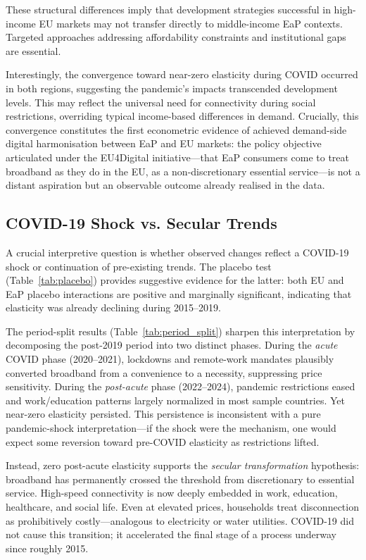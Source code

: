 These structural differences imply that development strategies successful in high-income EU markets may not transfer directly to middle-income EaP contexts. Targeted approaches addressing affordability constraints and institutional gaps are essential.

Interestingly, the convergence toward near-zero elasticity during COVID occurred in both regions, suggesting the pandemic's impacts transcended development levels. This may reflect the universal need for connectivity during social restrictions, overriding typical income-based differences in demand. Crucially, this convergence constitutes the first econometric evidence of achieved demand-side digital harmonisation between EaP and EU markets: the policy objective articulated under the EU4Digital initiative---that EaP consumers come to treat broadband as they do in the EU, as a non-discretionary essential service---is not a distant aspiration but an observable outcome already realised in the data.

\subsection{COVID-19 Shock vs. Secular Trends}

A crucial interpretive question is whether observed changes reflect a COVID-19 shock or
continuation of pre-existing trends. The placebo test (Table~\ref{tab:placebo}) provides
suggestive evidence for the latter: both EU and EaP
placebo interactions are positive and marginally significant, indicating that elasticity
was already declining during 2015--2019.

The period-split results (Table~\ref{tab:period_split}) sharpen this interpretation by
decomposing the post-2019 period into two distinct phases. During the \emph{acute} COVID
phase (2020--2021), lockdowns and remote-work mandates plausibly converted broadband from
a convenience to a necessity, suppressing price sensitivity. During the \emph{post-acute}
phase (2022--2024), pandemic restrictions eased and work/education patterns largely normalized
in most sample countries. Yet near-zero elasticity persisted. This persistence is
inconsistent with a pure pandemic-shock interpretation---if the shock were the mechanism,
one would expect some reversion toward pre-COVID elasticity as restrictions lifted.

Instead, zero post-acute elasticity supports the \emph{secular transformation} hypothesis:
broadband has permanently crossed the threshold from discretionary to essential service.
High-speed connectivity is now deeply embedded
in work, education, healthcare, and social life. Even at elevated prices, households treat
disconnection as prohibitively costly---analogous to electricity or water utilities. COVID-19
did not cause this transition; it accelerated the final stage of a process underway since
roughly 2015.

